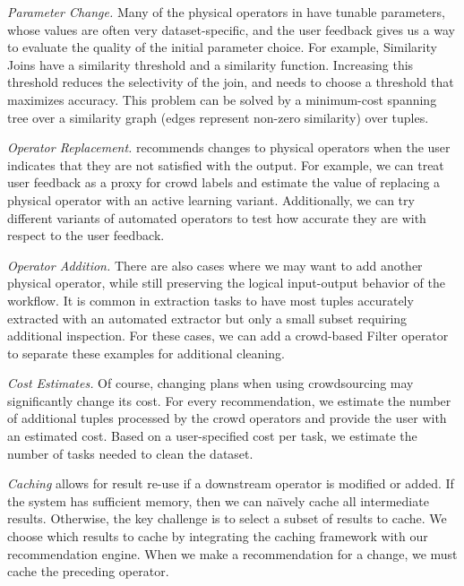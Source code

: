 \vspace{.4em}

\textit{Parameter Change.} Many of the physical operators in \sys have tunable parameters, whose values are often very dataset-specific, and the user feedback gives us a way to evaluate the quality of the initial parameter choice. 
For example, Similarity Joins have a similarity threshold and a similarity function. 
Increasing this threshold reduces the selectivity of the join, and \sys needs to choose a threshold that maximizes accuracy. 
This problem can be solved by a minimum-cost spanning tree over a similarity graph (edges represent non-zero similarity) over tuples.

\vspace{.4em}

\textit{Operator Replacement.} 
\sys recommends changes to physical operators when the user indicates that they are not satisfied with the output.
For example, we can treat user feedback as a proxy for crowd labels and estimate the value of replacing a physical operator with an active learning variant.
Additionally, we can try different variants of automated operators to test how accurate they are with respect to the user feedback.

\vspace{.4em}

\textit{Operator Addition.}  There are also cases where we may want to add another physical operator, while still preserving the logical input-output behavior of the workflow.
It is common in extraction tasks to have most tuples accurately extracted with an automated extractor but only a small subset requiring additional inspection. 
For these cases, we can add a crowd-based \textsf{Filter} operator to separate these examples for additional cleaning.

\vspace{.4em}

\textit{Cost Estimates.} Of course, changing plans when using crowdsourcing may significantly change its cost.
For every recommendation, we estimate the number of additional tuples processed by the crowd operators and provide the user with an estimated cost.
Based on a user-specified cost per task, we estimate the number of tasks needed to clean the dataset.

\vspace{.4em}

\textit{Caching} allows for result re-use if a downstream operator is modified or added.
If the system has sufficient memory, then we can na\"{\i}vely cache all intermediate results. 
Otherwise, the key challenge is to select a subset of results to cache.
We choose which results to cache by integrating the caching framework with our recommendation engine.
When we make a recommendation for a change, we must cache the preceding operator. 

